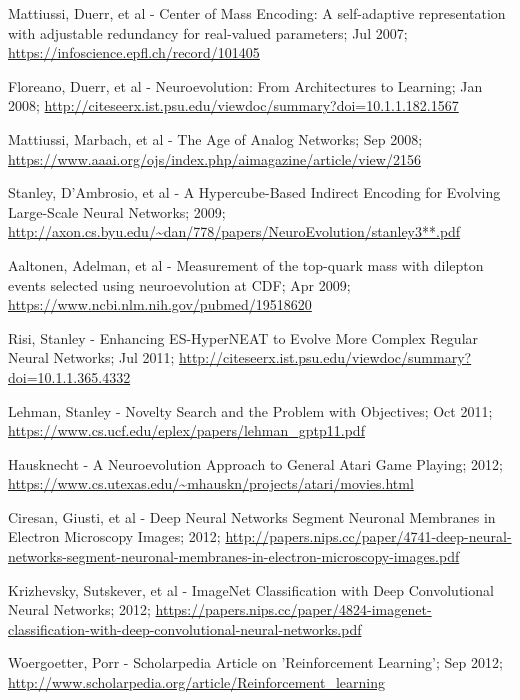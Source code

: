 \documentclass[journal, a4paper]{IEEEtran}
\begin{document}
\begin{thebibliography}{5}
    Mattiussi, Duerr, et al - Center of Mass Encoding: A self-adaptive representation with adjustable redundancy for real-valued parameters; Jul 2007;
    \url{https://infoscience.epfl.ch/record/101405}

    Floreano, Duerr, et al - Neuroevolution: From Architectures to Learning; Jan 2008;
    \url{http://citeseerx.ist.psu.edu/viewdoc/summary?doi=10.1.1.182.1567}

    Mattiussi, Marbach, et al - The Age of Analog Networks; Sep 2008;
    \url{https://www.aaai.org/ojs/index.php/aimagazine/article/view/2156}

    Stanley, D’Ambrosio, et al - A Hypercube-Based Indirect Encoding for Evolving Large-Scale Neural Networks; 2009;
    \url{http://axon.cs.byu.edu/~dan/778/papers/NeuroEvolution/stanley3**.pdf}

    Aaltonen, Adelman, et al - Measurement of the top-quark mass with dilepton events selected using neuroevolution at CDF; Apr 2009;
    \url{https://www.ncbi.nlm.nih.gov/pubmed/19518620}

    Risi, Stanley - Enhancing ES-HyperNEAT to Evolve More Complex Regular Neural Networks; Jul 2011;
    \url{http://citeseerx.ist.psu.edu/viewdoc/summary?doi=10.1.1.365.4332}

    Lehman, Stanley - Novelty Search and the Problem with Objectives; Oct 2011;
    \url{https://www.cs.ucf.edu/eplex/papers/lehman_gptp11.pdf}

    Hausknecht - A Neuroevolution Approach to General Atari Game Playing; 2012;
    \url{https://www.cs.utexas.edu/~mhauskn/projects/atari/movies.html}

    Ciresan, Giusti, et al - Deep Neural Networks Segment Neuronal Membranes in Electron Microscopy Images; 2012;
    \url{http://papers.nips.cc/paper/4741-deep-neural-networks-segment-neuronal-membranes-in-electron-microscopy-images.pdf}

    Krizhevsky, Sutskever, et al - ImageNet Classification with Deep Convolutional Neural Networks; 2012;
    \url{https://papers.nips.cc/paper/4824-imagenet-classification-with-deep-convolutional-neural-networks.pdf}

    Woergoetter, Porr - Scholarpedia Article on 'Reinforcement Learning'; Sep 2012;
    \url{http://www.scholarpedia.org/article/Reinforcement_learning}


\end{thebibliography}
\end{document}
